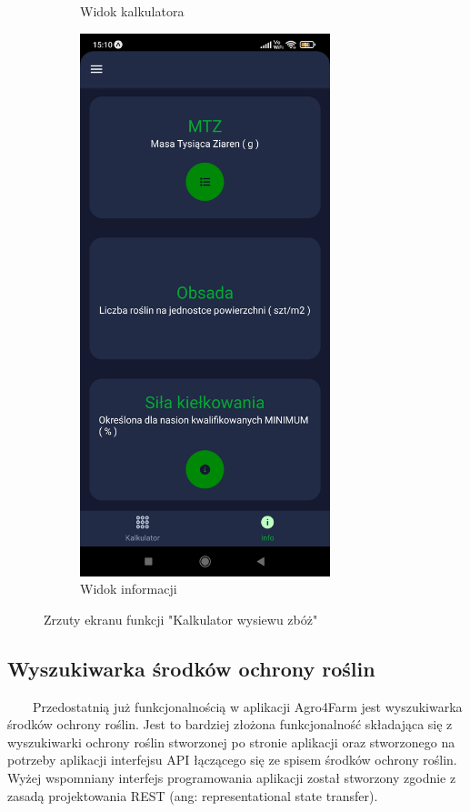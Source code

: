 \documentclass[a4paper,12pt,oneside]{book}
\begin{document}
\begin{figure}[H]
\begin{subfigure}{.5\textwidth}
			\caption{Widok kalkulatora}
		\end{subfigure}%
		\begin{subfigure}{.5\textwidth}
			\centering
			\includegraphics[width=0.8\textwidth]{grafika/kal_b.jpg}
			\caption{Widok informacji}
		\end{subfigure}
		\caption{Zrzuty ekranu funkcji "Kalkulator wysiewu zbóż"}
	\end{figure}
	
	\subsection{Wyszukiwarka środków ochrony roślin}
	\ \ \ \
		Przedostatnią już funkcjonalnością w aplikacji Agro4Farm jest wyszukiwarka środków ochrony roślin. Jest to bardziej złożona funkcjonalność składająca się z wyszukiwarki ochrony roślin stworzonej po stronie aplikacji oraz stworzonego na potrzeby aplikacji interfejsu API łączącego się ze spisem środków ochrony roślin. Wyżej wspomniany interfejs programowania aplikacji został stworzony zgodnie z zasadą projektowania REST (ang: representational state transfer).
		
\end{document}
